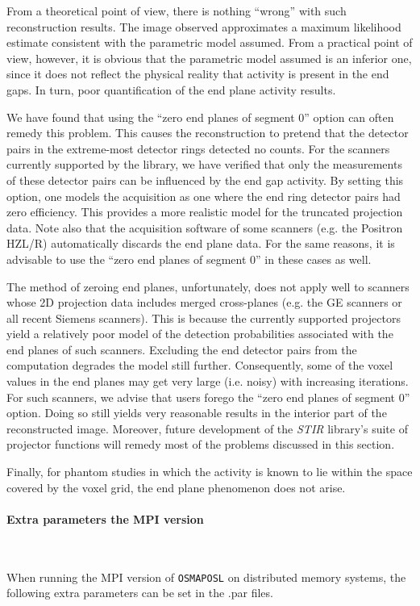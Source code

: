 \documentclass{article}
\newcommand{\subsubsubsection}[1]{\paragraph{#1}\mbox{} \\}
\begin{document}
{From a theoretical point of view, there is nothing ``wrong'' with 
such reconstruction results. The image observed approximates 
a maximum likelihood estimate consistent with the parametric 
model assumed. From a practical point of view, however, it is 
obvious that the parametric model assumed is an inferior one, 
since it does not reflect the physical reality that activity 
is present in the end gaps. In turn, poor quantification of the 
end plane activity results. 



We have found that using the ``zero end planes of segment 0'' 
option can often remedy this problem. This causes the reconstruction 
to pretend that the detector pairs in the extreme-most detector 
rings detected no counts. For the scanners currently supported 
by the library, we have verified that only the measurements of 
these detector pairs can be influenced by the end gap activity. 
By setting this option, one models 
the acquisition as one where the end ring detector pairs had 
zero efficiency. This provides a more realistic model for the 
truncated projection data. Note also that the acquisition software 
of some scanners (e.g. the Positron HZL/R) automatically discards 
the end plane data. For the same reasons, it is advisable to 
use the ``zero end planes of segment 0'' in these cases as well.



The method of zeroing end planes, unfortunately, does not apply 
well to scanners whose 2D projection data includes merged cross-planes 
(e.g. the GE scanners or all recent Siemens scanners). 
This is because the currently supported 
projectors yield a relatively poor model of the detection probabilities 
associated with the end planes of such scanners. Excluding the 
end detector pairs from the computation degrades the model still 
further. Consequently, some of the voxel values in the end planes 
may get very large (i.e. noisy) with increasing iterations. For such scanners, we 
advise that users forego the ``zero end planes of segment 0'' 
option. Doing so still yields very reasonable results in the 
interior part of the reconstructed image. Moreover, future development 
of the \textit{STIR} library's suite of projector functions will remedy 
most of the problems discussed in this section.


Finally, for phantom studies in which the activity is known to 
lie within the space covered by the voxel grid, the end plane 
phenomenon does not arise.

{\subsubsubsection{Extra parameters the MPI version}}
When running the MPI version of \texttt{OSMAPOSL} on distributed memory
systems, the following extra parameters can be set in the .par files.

}
\end{document}
